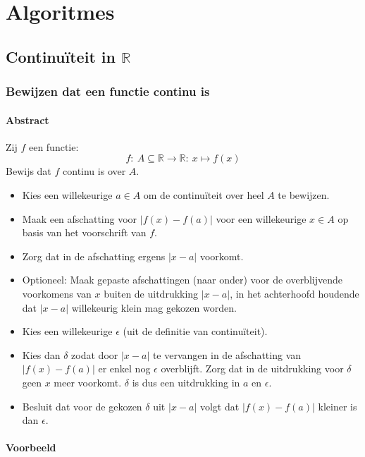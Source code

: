 \documentclass[main.tex]{subfiles}
\begin{document}
\chapter{Algoritmes}
\label{cha:algoritmes}

\section{Continu\"iteit in $\mathbb{R}$}
\label{sec:continuiteit-mathbbr}

\subsection{Bewijzen dat een functie continu is}
\label{sec:bewijzen-dat-een}

\subsubsection{Abstract}
\label{sec:abstract}

Zij $f$ een functie:
\[ f:\ A \subseteq \mathbb{R} \rightarrow \mathbb{R}:\ x \mapsto f(x) \]
Bewijs dat $f$ continu is over $A$.

\begin{itemize}
\item Kies een willekeurige $a \in A$ om de continu\"iteit over heel $A$ te bewijzen.\needed
\item Maak een afschatting voor $|f(x)-f(a)|$ voor een willekeurige $x \in A$ op basis van het voorschrift van $f$.
\item Zorg dat in de afschatting ergens $|x-a|$ voorkomt.
\item Optioneel: Maak gepaste afschattingen (naar onder) voor de overblijvende voorkomens van $x$ buiten de uitdrukking $|x-a|$, in het achterhoofd houdende dat $|x-a|$ willekeurig klein mag gekozen worden.
\item Kies een willekeurige $\epsilon$ (uit de definitie van continu\"iteit).
\item Kies dan $\delta$ zodat door $|x-a|$ te vervangen in de afschatting van $|f(x)-f(a)|$ er enkel nog $\epsilon$ overblijft. Zorg dat in de uitdrukking voor $\delta$ geen $x$ meer voorkomt.
$\delta$ is dus een uitdrukking in $a$ en $\epsilon$.
\item Besluit dat voor de gekozen $\delta$ uit $|x-a|$ volgt dat $|f(x)-f(a)|$ kleiner is dan $\epsilon$.
\end{itemize}
\feed
\subsubsection{Voorbeeld}
\label{sec:voorbeeld}
\end{document}
